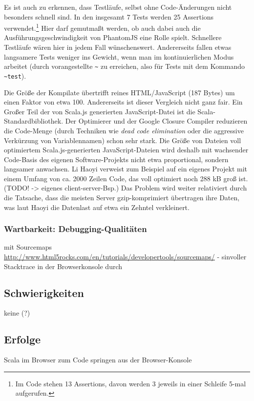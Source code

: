 \documentclass[a4paper, 12pt, hidelinks, listof=totoc, listoftables=totoc, bibliography=totoc]{scrreprt}
\begin{document}
Es ist auch zu erkennen, dass Testläufe, selbst ohne Code-Änderungen nicht besonders schnell sind. In den insgesamt 7 Tests werden 25 Assertions verwendet.\footnote{
	Im Code stehen 13 Assertions, davon werden 3 jeweils in einer Schleife 5-mal aufgerufen.}
Hier darf gemutmaßt werden, ob auch dabei auch die Ausführungsgeschwindigkeit von PhantomJS eine Rolle spielt. Schnellere Testläufe wären hier in jedem Fall wünschenswert. Andererseits fallen etwas langsamere Tests weniger ins Gewicht, wenn man 
im kontinuierlichen Modus arbeitet (durch vorangestellte \texttt{\textasciitilde} zu erreichen, also für Tests mit dem Kommando \texttt{\textasciitilde{}test}).

Die Größe der Kompilate übertrifft reines HTML/JavaScript (187 Bytes) um einen Faktor von etwa 100. Andererseits ist dieser Vergleich nicht ganz fair. Ein Großer Teil der von Scala.js generierten JavaScript-Datei ist die Scala-Standardbibliothek.
Der Optimierer und der Google Closure Compiler reduzieren die Code-Menge (durch Techniken wie \textit{dead code elimination} oder die aggressive Verkürzung von Variablennamen) schon sehr stark. Die Größe von Dateien voll optimiertem Scala.js-generierten JavaScript-Dateien wird deshalb mit wachsender Code-Basis des eigenen Software-Projekts nicht etwa proportional, sondern langsamer anwachsen. Li Haoyi verweist zum Beispiel auf ein eigenes Projekt mit einem Umfang von ca. 2000 Zeilen Code, das voll optimiert noch 288 kB groß ist. (TODO! -> eigenes client-server-Bsp.) Das Problem wird weiter relativiert durch die Tatsache, dass die meisten Server gzip-komprimiert übertragen ihre Daten, was laut Haoyi die Datenlast auf etwa ein Zehntel verkleinert.\cite[\#BlobSize]{haoyi.HOS}

\subsubsection{Wartbarkeit: Debugging-Qualitäten}

mit Sourcemaps
\url{http://www.html5rocks.com/en/tutorials/developertools/sourcemaps/}
	- sinvoller Stacktrace in der Browserkonsole durch


\subsection{Schwierigkeiten}
keine (?)
\subsection{Erfolge}
Scala im Browser
zum Code springen aus der Browser-Konsole
\end{document}
